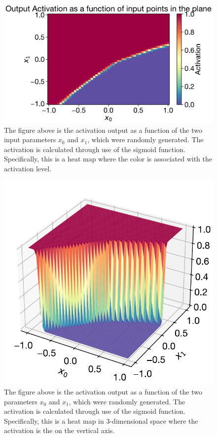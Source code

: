 \begin{figure}[H]
\centering
\includegraphics[scale=0.65]{../figures/activation_heat_map.pdf}
\caption{The figure above is the activation output as a function of the two input parameters $x_0$ and $x_1$, which were randomly generated. The activation is calculated through use of the sigmoid function. Specifically, this is a heat map where the color is associated with the activation level.}
\end{figure}

\begin{figure}[H]
\centering
\includegraphics[scale=0.65]{../figures/activation_3d.pdf}
\caption{The figure above is the activation output as a function of the two parameters $x_0$ and $x_1$, which were randomly generated. The activation is calculated through use of the sigmoid function. Specifically, this is a heat map in 3-dimensional space where the activation is the on the vertical axis.}
\end{figure}


